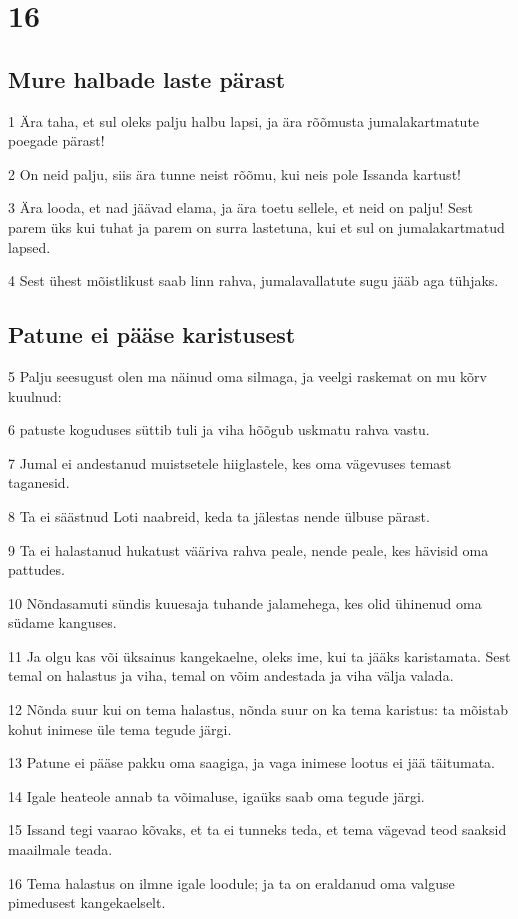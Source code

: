 \chapter{16}

\section*{Mure halbade laste pärast}

\par 1 Ära taha, et sul oleks palju halbu lapsi, ja ära rõõmusta jumalakartmatute poegade pärast!
\par 2 On neid palju, siis ära tunne neist rõõmu, kui neis pole Issanda kartust!
\par 3 Ära looda, et nad jäävad elama, ja ära toetu sellele, et neid on palju! Sest parem üks kui tuhat ja parem on surra lastetuna, kui et sul on jumalakartmatud lapsed.
\par 4 Sest ühest mõistlikust saab linn rahva, jumalavallatute sugu jääb aga tühjaks.

\section*{Patune ei pääse karistusest}

\par 5 Palju seesugust olen ma näinud oma silmaga, ja veelgi raskemat on mu kõrv kuulnud:
\par 6 patuste koguduses süttib tuli ja viha hõõgub uskmatu rahva vastu.
\par 7 Jumal ei andestanud muistsetele hiiglastele, kes oma vägevuses temast taganesid.
\par 8 Ta ei säästnud Loti naabreid, keda ta jälestas nende ülbuse pärast.
\par 9 Ta ei halastanud hukatust vääriva rahva peale, nende peale, kes hävisid oma pattudes.
\par 10 Nõndasamuti sündis kuuesaja tuhande jalamehega, kes olid ühinenud oma südame kanguses.
\par 11 Ja olgu kas või üksainus kangekaelne, oleks ime, kui ta jääks karistamata. Sest temal on halastus ja viha, temal on võim andestada ja viha välja valada.
\par 12 Nõnda suur kui on tema halastus, nõnda suur on ka tema karistus: ta mõistab kohut inimese üle tema tegude järgi.
\par 13 Patune ei pääse pakku oma saagiga, ja vaga inimese lootus ei jää täitumata.
\par 14 Igale heateole annab ta võimaluse, igaüks saab oma tegude järgi.
\par 15 Issand tegi vaarao kõvaks, et ta ei tunneks teda, et tema vägevad teod saaksid maailmale teada.
\par 16 Tema halastus on ilmne igale loodule; ja ta on eraldanud oma valguse pimedusest kangekaelselt.

